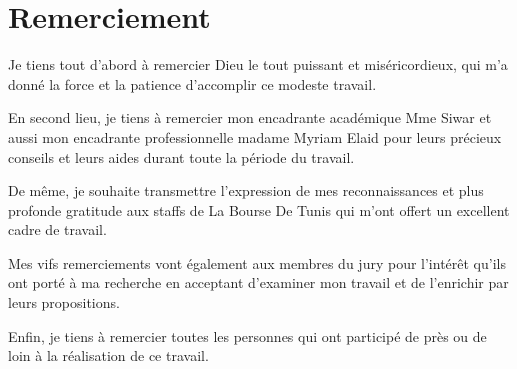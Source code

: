 \section*{Remerciement}

Je tiens tout d'abord à remercier Dieu le tout puissant et miséricordieux, qui m'a donné
la force et la patience d'accomplir ce modeste travail.

En second lieu, je tiens à remercier mon encadrante académique Mme Siwar
et aussi mon encadrante professionnelle madame Myriam Elaid pour leurs
précieux conseils et leurs aides durant toute la période du travail.

De même, je souhaite transmettre l'expression de mes reconnaissances et plus profonde
gratitude aux staffs de La Bourse De Tunis qui m'ont offert un excellent cadre de travail.

Mes vifs remerciements vont également aux membres du jury pour l'intérêt qu'ils ont
porté à ma recherche en acceptant d'examiner mon travail et de l'enrichir par leurs
propositions.

Enfin, je tiens à remercier toutes les personnes qui ont participé de près ou de loin à la
réalisation de ce travail.

\newpage




